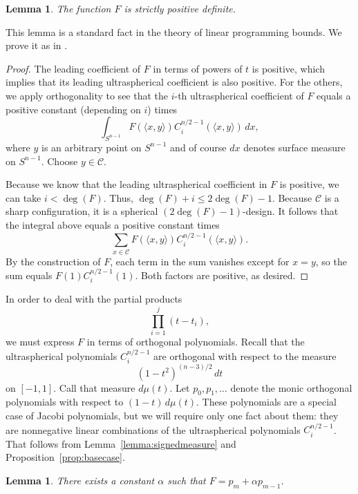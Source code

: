 \documentclass{jams-l}
\theoremstyle{plain}
\newtheorem{lemma}[theorem]{Lemma}
\numberwithin{theorem}{section}
\theoremstyle{definition}
\numberwithin{equation}{section}
\newcommand{\CodeS}{\mathcal{C}}
\begin{document}
\begin{lemma} \label{lemma:gposdef}
The function $F$ is strictly positive definite.
\end{lemma}

This lemma is a standard fact in the theory of linear programming
bounds.  We prove it as in \cite{E}.

\begin{proof}
The leading coefficient of $F$ in terms of powers of $t$ is
positive, which implies that its leading ultraspherical
coefficient is also positive.  For the others, we apply
orthogonality to see that the $i$-th ultraspherical coefficient of
$F$ equals a positive constant (depending on $i$) times
$$
\int_{S^{n-1}} F(\langle x, y \rangle) C_i^{n/2-1}(\langle x, y
\rangle)\, dx,
$$
where $y$ is an arbitrary point on $S^{n-1}$ and of course $dx$
denotes surface measure on $S^{n-1}$.  Choose $y \in \CodeS$.

Because we know that the leading ultraspherical coefficient in $F$
is positive, we can take $i < \deg(F)$.  Thus, $\deg(F) + i \le
2\deg(F)-1$.  Because $\CodeS$ is a sharp configuration, it is a
spherical $(2\deg(F)-1)$-design.  It follows that the integral
above equals a positive constant times
$$
\sum_{x \in \CodeS} F(\langle x, y \rangle) C_i^{n/2-1}(\langle x,
y \rangle).
$$
By the construction of $F$, each term in the sum vanishes except
for $x=y$, so the sum equals $F(1) C_i^{n/2-1}(1)$.  Both factors
are positive, as desired.
\end{proof}

In order to deal with the partial products
$$
\prod_{i=1}^j (t-t_i),
$$
we must express $F$ in terms of orthogonal polynomials. Recall
that the ultraspherical polynomials $C^{n/2-1}_i$ are orthogonal
with respect to the measure
$$
(1-t^2)^{(n-3)/2}\, dt
$$ on $[-1,1]$.  Call that measure $d\mu(t)$.
Let $p_0,p_1,\dots$ denote the monic orthogonal polynomials with
respect to $(1-t) \,d\mu(t)$.  These polynomials are a special
case of Jacobi polynomials, but we will require only one fact
about them: they are nonnegative linear combinations of the
ultraspherical polynomials $C_i^{n/2-1}$.  That follows from
Lemma~\ref{lemma:signedmeasure} and
Proposition~\ref{prop:basecase}.

\begin{lemma} \label{lemma:orthoexpress}
There exists a constant $\alpha$ such that $F = p_m + \alpha
p_{m-1}$.
\end{lemma}
\end{document}
